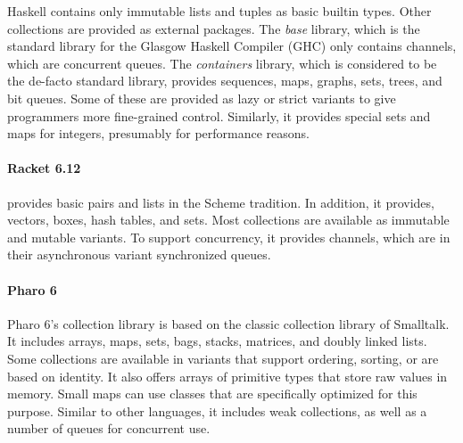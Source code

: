 \documentclass[sigconf, 10pt]{acmart}
\begin{document}

Haskell contains only immutable lists and tuples as basic builtin types.
Other collections are provided as external packages.
The \emph{base} library,
which is the standard library for the Glasgow Haskell Compiler (GHC)
only contains channels, which are concurrent queues.
The \emph{containers} library,
which is considered to be the de-facto standard library,
provides sequences, maps, graphs, sets, trees, and bit queues.
Some of these are provided as lazy or strict variants
to give programmers more fine-grained control.
Similarly, it provides special sets and maps for integers,
presumably for performance reasons.


\paragraph{Racket 6.12}

 provides basic pairs and lists in the Scheme tradition.
In addition, it provides, vectors, boxes, hash tables, and sets.
Most collections are available as immutable and mutable variants.
To support concurrency, it provides channels,
which are in their asynchronous variant synchronized queues.

\paragraph{Pharo 6}
Pharo 6's collection library is based on the classic collection library
of Smalltalk\citep{Smalltalk80,Cook:1992:ISS}.
It includes arrays, maps, sets, bags, stacks, matrices, and doubly linked lists.
Some collections are available in variants that support ordering, sorting,
or are based on identity.
It also offers arrays of primitive types that store raw values in memory.
Small maps can use classes that are specifically optimized for this purpose.
Similar to other languages,
it includes weak collections, as well as a number of queues for concurrent use.
\end{document}
